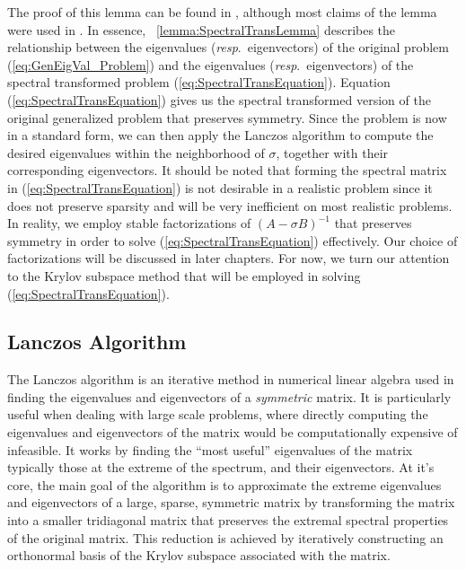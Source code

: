  The proof of this lemma can be found in \cite{stewart2024spectraltransformationdensesymmetric}, although most claims of the lemma were used in \cite{Ericsson1980TheST}. In essence, ~\ref{lemma:SpectralTransLemma} describes the relationship between the eigenvalues (\textit{resp}.\ eigenvectors) of the original problem (\ref{eq:GenEigVal_Problem}) and the eigenvalues (\textit{resp}.\ eigenvectors) of the spectral transformed problem (\ref{eq:SpectralTransEquation}). Equation (\ref{eq:SpectralTransEquation}) gives us the spectral transformed version of the original generalized problem that preserves symmetry. Since the problem is now in a standard form, we can then apply the Lanczos algorithm to compute the desired eigenvalues within the neighborhood of $\sigma$, together with their corresponding eigenvectors. It should be noted that forming the spectral matrix in (\ref{eq:SpectralTransEquation}) is not desirable in a realistic problem since it does not preserve sparsity and will be very inefficient on most realistic problems. In reality, we employ stable factorizations of $(A-\sigma B)^{-1}$ that preserves symmetry in order to solve (\ref{eq:SpectralTransEquation}) effectively. Our choice of factorizations will be discussed in later chapters. For now, we turn our attention to the Krylov subspace method that will be employed in solving (\ref{eq:SpectralTransEquation}).

\subsection{Lanczos Algorithm}\label{sec:LanczosAlgorithm}

The Lanczos algorithm is an iterative method in numerical linear algebra used in finding the eigenvalues and eigenvectors of a \textit{symmetric} matrix. It is particularly useful when dealing with large scale problems, where directly computing the eigenvalues and eigenvectors of the matrix would be computationally expensive of infeasible. It works by finding the ``most useful'' eigenvalues of the matrix \textemdash\, typically those at the extreme of the spectrum, and their eigenvectors. At it's core, the main goal of the algorithm is to approximate the extreme eigenvalues and eigenvectors of a large, sparse, symmetric matrix by transforming the matrix into a smaller tridiagonal matrix that preserves the extremal spectral properties of the original matrix. This reduction is achieved by iteratively constructing an orthonormal basis of the Krylov subspace associated with the matrix.

